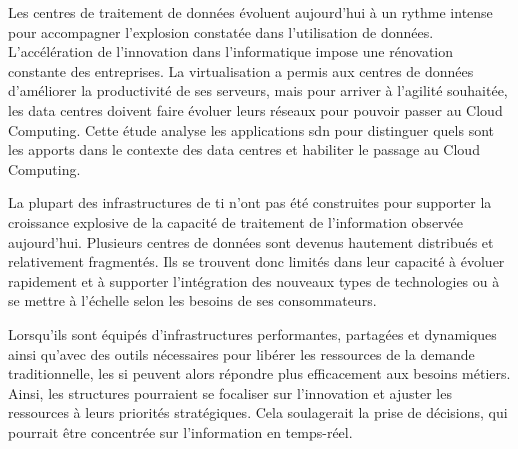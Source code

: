 


Les centres de traitement de données évoluent aujourd'hui à un rythme intense pour accompagner l'explosion constatée dans l'utilisation de données. L'accélération de l'innovation dans l'informatique impose une rénovation constante des entreprises. La virtualisation a permis aux centres de données d'améliorer la productivité de ses serveurs, mais pour arriver à l'agilité souhaitée, les data centres doivent faire évoluer leurs réseaux pour pouvoir passer au Cloud Computing. Cette étude analyse les applications \gls{sdn} pour distinguer quels sont les apports dans le contexte des data centres et habiliter le passage au Cloud Computing.

\par 
La plupart des infrastructures de \gls{ti} n'ont pas été construites pour supporter la croissance explosive de la capacité de traitement de l'information observée aujourd'hui. Plusieurs centres de données sont devenus hautement distribués et relativement fragmentés. Ils se trouvent donc limités dans leur capacité à évoluer rapidement et à supporter l'intégration des nouveaux types de technologies ou à se mettre à l'échelle selon les besoins de ses consommateurs.

\par 
Lorsqu'ils sont équipés d'infrastructures performantes, partagées et dynamiques ainsi qu'avec des outils nécessaires pour libérer les ressources de la demande traditionnelle, les \gls{si} peuvent alors répondre plus efficacement aux besoins métiers. Ainsi, les structures pourraient se focaliser sur l'innovation et ajuster les ressources à leurs priorités stratégiques. Cela soulagerait la prise de décisions, qui pourrait être concentrée sur l'information en temps-réel.

